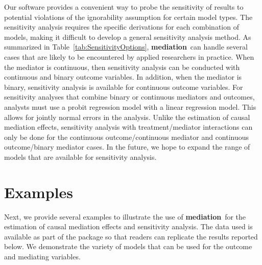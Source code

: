 \documentclass[11pt,letterpaper]{article}
\theoremstyle{plain}
\newcommand\bmediation{{\bf mediation}}
\begin{document}
Our software provides a convenient way to probe the sensitivity of
results to potential violations of the ignorability assumption for
certain model types. The sensitivity analysis requires the specific
derivations for each combination of models, making it difficult to
develop a general sensitivity analysis method.  As summarized in
Table~\ref{tab:SensitivityOptions}, \bmediation\ can handle several
cases that are likely to be encountered by applied researchers in
practice. When the mediator is continuous, then sensitivity analysis
can be conducted with continuous and binary outcome variables.  In
addition, when the mediator is binary, sensitivity analysis is
available for continuous outcome variables.  For sensitivity analyses
that combine binary or continuous mediators and outcomes, analysts
must use a probit regression model with a linear regression model.
This allows for jointly normal errors in the analysis. Unlike the
estimation of causal mediation effects, sensitivity analysis with
treatment/mediator interactions can only be done for the continuous outcome/continuous mediator and continuous outcome/binary mediator cases.  In the future, we hope to expand the range of models that
are available for sensitivity analysis.

\section{Examples}

Next, we provide several examples to illustrate the use of
\bmediation\ for the estimation of causal mediation effects and
sensitivity analysis.  The data used is available as part of the
package so that readers can replicate the results reported below.  We
demonstrate the variety of models that can be used for the outcome and
mediating variables.
\end{document}
